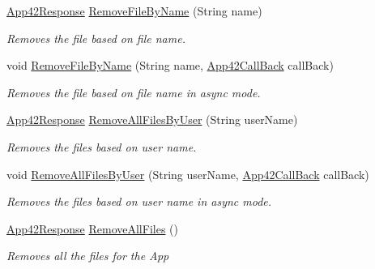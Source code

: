 \begin{DoxyCompactItemize}
\hyperlink{classcom_1_1shephertz_1_1app42_1_1paas_1_1sdk_1_1csharp_1_1_app42_response}{App42\+Response} \hyperlink{classcom_1_1shephertz_1_1app42_1_1paas_1_1sdk_1_1csharp_1_1upload_1_1_upload_service_a2ee9c981cb3bfc5b61cbcb2a5ea0b186}{Remove\+File\+By\+Name} (String name)
\begin{DoxyCompactList}\small\item\em Removes the file based on file name. \end{DoxyCompactList}\item 
void \hyperlink{classcom_1_1shephertz_1_1app42_1_1paas_1_1sdk_1_1csharp_1_1upload_1_1_upload_service_af78c8c529be7d495143a6e1c09eaa578}{Remove\+File\+By\+Name} (String name, \hyperlink{interfacecom_1_1shephertz_1_1app42_1_1paas_1_1sdk_1_1csharp_1_1_app42_call_back}{App42\+Call\+Back} call\+Back)
\begin{DoxyCompactList}\small\item\em Removes the file based on file name in async mode. \end{DoxyCompactList}\item 
\hyperlink{classcom_1_1shephertz_1_1app42_1_1paas_1_1sdk_1_1csharp_1_1_app42_response}{App42\+Response} \hyperlink{classcom_1_1shephertz_1_1app42_1_1paas_1_1sdk_1_1csharp_1_1upload_1_1_upload_service_a15d03d0e36e841171779ea995444f931}{Remove\+All\+Files\+By\+User} (String user\+Name)
\begin{DoxyCompactList}\small\item\em Removes the files based on user name. \end{DoxyCompactList}\item 
void \hyperlink{classcom_1_1shephertz_1_1app42_1_1paas_1_1sdk_1_1csharp_1_1upload_1_1_upload_service_ae0dd662b1381051b0f9f7bb1f8aef991}{Remove\+All\+Files\+By\+User} (String user\+Name, \hyperlink{interfacecom_1_1shephertz_1_1app42_1_1paas_1_1sdk_1_1csharp_1_1_app42_call_back}{App42\+Call\+Back} call\+Back)
\begin{DoxyCompactList}\small\item\em Removes the files based on user name in async mode. \end{DoxyCompactList}\item 
\hyperlink{classcom_1_1shephertz_1_1app42_1_1paas_1_1sdk_1_1csharp_1_1_app42_response}{App42\+Response} \hyperlink{classcom_1_1shephertz_1_1app42_1_1paas_1_1sdk_1_1csharp_1_1upload_1_1_upload_service_a73992dd7cac338a4d7e7511051fe17f3}{Remove\+All\+Files} ()
\begin{DoxyCompactList}\small\item\em Removes all the files for the App \end{DoxyCompactList}\item 

\end{DoxyCompactItemize}
